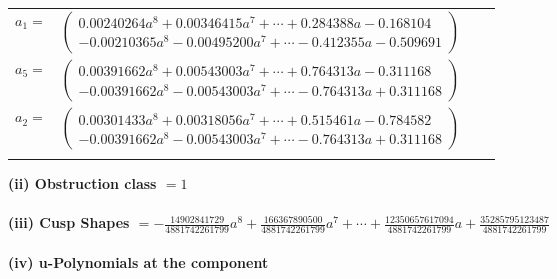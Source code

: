 \documentclass[1p]{elsarticle_modified}
\theoremstyle{definition}
\begin{document}
\begin{tabular}{m{7pt} m{180pt} m{7pt} m{180pt} }
\flushright $a_{1}=$&$\begin{pmatrix}0.00240264 a^{8}+0.00346415 a^{7}+\cdots+0.284388 a-0.168104\\-0.00210365 a^{8}-0.00495200 a^{7}+\cdots-0.412355 a-0.509691\end{pmatrix}$ \\
\flushright $a_{5}=$&$\begin{pmatrix}0.00391662 a^{8}+0.00543003 a^{7}+\cdots+0.764313 a-0.311168\\-0.00391662 a^{8}-0.00543003 a^{7}+\cdots-0.764313 a+0.311168\end{pmatrix}$ \\
\flushright $a_{2}=$&$\begin{pmatrix}0.00301433 a^{8}+0.00318056 a^{7}+\cdots+0.515461 a-0.784582\\-0.00391662 a^{8}-0.00543003 a^{7}+\cdots-0.764313 a+0.311168\end{pmatrix}$\\&\end{tabular}
\flushleft \textbf{(ii) Obstruction class $= 1$}\\~\\
\flushleft \textbf{(iii) Cusp Shapes $= -\frac{14902841729}{4881742261799} a^8+\frac{166367890500}{4881742261799} a^7+\cdots+\frac{12350657617094}{4881742261799} a+\frac{35285795123487}{4881742261799}$}\\~\\
\newpage\renewcommand{\arraystretch}{1}
\flushleft \textbf{(iv) u-Polynomials at the component}\newline \\
\end{document}
